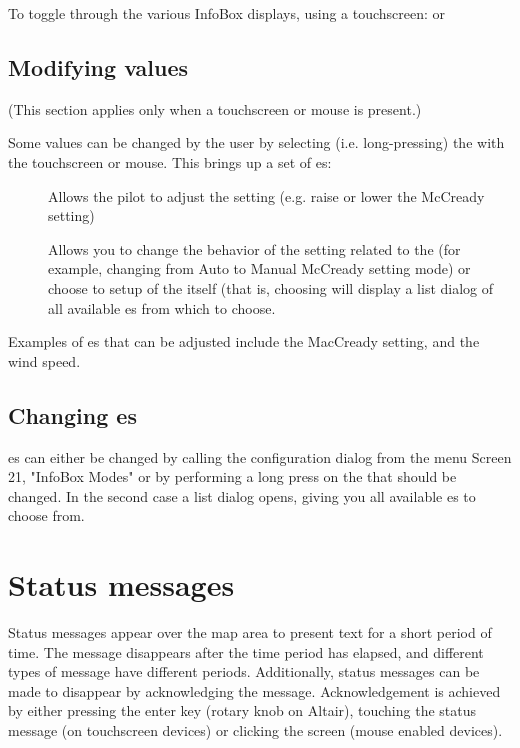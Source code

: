 To toggle through the various InfoBox displays, using a touchscreen:
or


\subsection*{Modifying {\InfoBox} values}
(This section applies only when a touchscreen or mouse is present.)

Some {\InfoBox} values can be changed by the user by selecting (i.e. long-pressing) the
{\InfoBox} with the touchscreen or mouse.  This brings up a set of {\InfoBox}es:

\begin{description}
\item[]  
  Allows the pilot to adjust the {\InfoBox} setting (e.g. raise or lower the McCready setting)

\item[]
	Allows you to change the behavior of the setting related to the {\InfoBox} (for example, changing from Auto to Manual McCready setting mode) or choose to setup of the {\InfoBox} itself (that is, choosing  will display a list dialog of all available {\InfoBox}es from which to choose.

\end{description}


Examples of {\InfoBox}es that can
be adjusted include the MacCready setting, and the wind speed.

\subsection*{Changing {\InfoBox}es}
{\InfoBox}es can either be changed by calling the configuration dialog from the
menu \blink{}\blink{} Screen 21, "InfoBox Modes" or by
performing a long press on the {\InfoBox} that should be changed. In the second case a list dialog opens,
giving you all available {\InfoBox}es to choose from.

\section{Status messages}
Status messages appear over the map area to present text for a short period of
time.  The message disappears after the time period has elapsed, and different
types of message have different periods. Additionally, status messages can be
made to disappear by acknowledging the message.  Acknowledgement is achieved by
either pressing the enter key (rotary knob on Altair), touching the status
message (on touchscreen devices) or clicking the screen (mouse enabled devices).

